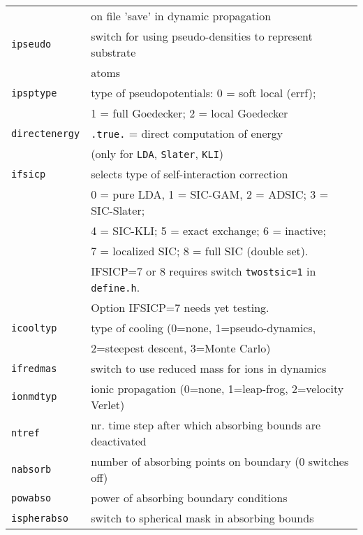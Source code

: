 \documentclass[12pt]{article}
\begin{document}
\begin{enumerate}
\begin{tabular}{ll}
{\tt                  }& on file 'save' in dynamic propagation\\
{\tt ipseudo          }& switch for using pseudo-densities to represent substrate\\
{\tt                  }& atoms \\
{\tt ipsptype         }& type of pseudopotentials: 0 = soft local (errf);\\
                       & 1 = full Goedecker; 2 = local Goedecker\\
{\tt directenergy}   & {\tt .true.} = direct computation of energy \\
                       & (only for {\tt LDA}, {\tt Slater}, {\tt KLI})\\
{\tt ifsicp           }& selects type of self-interaction correction\\
    &  0 = pure LDA, 1 = SIC-GAM, 2 = ADSIC; 3 = SIC-Slater; \\
    &  4 = SIC-KLI; 5 = exact exchange; 6 = inactive;\\
    &  7 = localized SIC;  8 = full SIC (double set).\\
    & IFSICP=7 or 8 requires switch
     {\tt twostsic=1} in {\tt define.h}.\\
    & Option IFSICP=7 needs yet testing.\\
{\tt icooltyp         }& type of cooling (0=none, 1=pseudo-dynamics,\\
{\tt                  }& 2=steepest descent, 3=Monte Carlo)\\
{\tt ifredmas         }& switch to use reduced mass for ions in dynamics\\
{\tt ionmdtyp         }& ionic propagation
                         (0=none, 1=leap-frog, 2=velocity Verlet)\\
{\tt ntref}& nr. time step after which absorbing bounds are deactivated
\\
{\tt nabsorb}          & number of absorbing points on boundary (0 switches off) 
\\
{\tt powabso}          & power of absorbing boundary conditions
\\
{\tt ispherabso}       & switch to spherical mask in absorbing bounds
\\
\hline
\end{tabular}


\end{enumerate}
\end{document}
